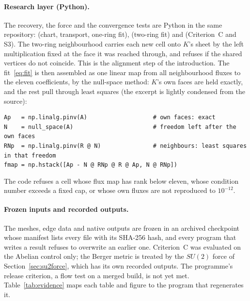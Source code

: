 \documentclass[11pt]{article}
\theoremstyle{definition}
\theoremstyle{remark}
\newcommand{\BW}{Criterion~C}
\begin{document}
\paragraph{Research layer (Python).}
The recovery, the force and the convergence tests are Python in the same repository:
 (chart, transport, one-ring fit),
 (two-ring fit) and
 (\BW{} and S3). The two-ring neighbourhood
carries each new cell onto $K$'s sheet by the left multiplication fixed at the face it
was reached through, and refuses if the shared vertices do not coincide. This is the alignment step of the introduction.
The fit~\eqref{eq:fit} is then assembled as one linear map from all neighbourhood fluxes
to the eleven coefficients, by the null-space method: $K$'s own faces are held exactly,
and the rest pull through least squares (the excerpt is lightly condensed from the source):
\begin{lstlisting}[style=py]
Ap   = np.linalg.pinv(A)                   # own faces: exact
N    = null_space(A)                       # freedom left after the own faces
RNp  = np.linalg.pinv(R @ N)               # neighbours: least squares in that freedom
fmap = np.hstack([Ap - N @ RNp @ R @ Ap, N @ RNp])
\end{lstlisting}
The code refuses a cell whose flux map has rank below eleven, whose condition number
exceeds a fixed cap, or whose own fluxes are not reproduced to $10^{-12}$.

\paragraph{Frozen inputs and recorded outputs.}
The meshes, edge data and native outputs are frozen in an archived checkpoint whose manifest lists
every file with its SHA-256 hash, and every program that writes a result refuses to overwrite an
earlier one. Criterion~C was evaluated on the Abelian control only; the Berger metric is treated by
the $SU(2)$ force of Section~\ref{sec:su2force}, which has its own recorded outputs. The programme's
release criterion, a flow test on a merged build, is not yet met. Table~\ref{tab:evidence} maps each
table and figure to the program that regenerates it.
\end{document}
